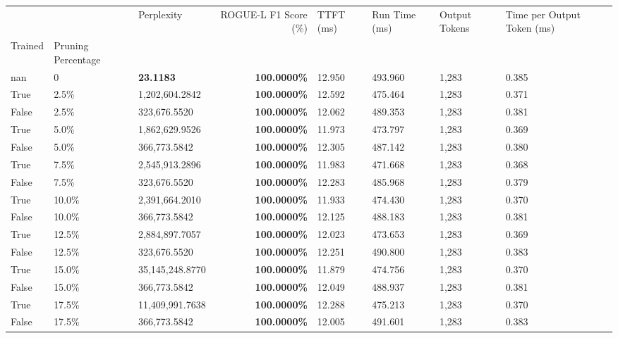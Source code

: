 \begin{table}[H]
\label{tab:evaluation-pipeline-13}
\begin{tabular}{lllrllll}
\toprule
 &  & Perplexity & ROGUE-L F1 Score (\%) & TTFT (ms) & Run Time (ms) & Output Tokens & Time per Output Token (ms) \\
Trained & Pruning Percentage &  &  &  &  &  &  \\
\midrule
nan & 0 & \bfseries 23.1183 & \bfseries 100.0000\% & 12.950 & 493.960 & 1,283 & 0.385 \\
\cline{1-8}
True & 2.5\% & 1,202,604.2842 & \bfseries \color{red} 100.0000\% & 12.592 & 475.464 & 1,283 & 0.371 \\
\cline{1-8}
False & 2.5\% & 323,676.5520 & \bfseries \color{red} 100.0000\% & 12.062 & 489.353 & 1,283 & 0.381 \\
\cline{1-8}
True & 5.0\% & 1,862,629.9526 & \bfseries \color{red} 100.0000\% & 11.973 & 473.797 & 1,283 & 0.369 \\
\cline{1-8}
False & 5.0\% & 366,773.5842 & \bfseries \color{red} 100.0000\% & 12.305 & 487.142 & 1,283 & 0.380 \\
\cline{1-8}
True & 7.5\% & 2,545,913.2896 & \bfseries \color{red} 100.0000\% & 11.983 & 471.668 & 1,283 & 0.368 \\
\cline{1-8}
False & 7.5\% & 323,676.5520 & \bfseries \color{red} 100.0000\% & 12.283 & 485.968 & 1,283 & 0.379 \\
\cline{1-8}
True & 10.0\% & 2,391,664.2010 & \bfseries \color{red} 100.0000\% & 11.933 & 474.430 & 1,283 & 0.370 \\
\cline{1-8}
False & 10.0\% & 366,773.5842 & \bfseries \color{red} 100.0000\% & 12.125 & 488.183 & 1,283 & 0.381 \\
\cline{1-8}
True & 12.5\% & 2,884,897.7057 & \bfseries \color{red} 100.0000\% & 12.023 & 473.653 & 1,283 & 0.369 \\
\cline{1-8}
False & 12.5\% & 323,676.5520 & \bfseries \color{red} 100.0000\% & 12.251 & 490.800 & 1,283 & 0.383 \\
\cline{1-8}
True & 15.0\% & 35,145,248.8770 & \bfseries \color{red} 100.0000\% & 11.879 & 474.756 & 1,283 & 0.370 \\
\cline{1-8}
False & 15.0\% & 366,773.5842 & \bfseries \color{red} 100.0000\% & 12.049 & 488.937 & 1,283 & 0.381 \\
\cline{1-8}
True & 17.5\% & 11,409,991.7638 & \bfseries \color{red} 100.0000\% & 12.288 & 475.213 & 1,283 & 0.370 \\
\cline{1-8}
False & 17.5\% & 366,773.5842 & \bfseries \color{red} 100.0000\% & 12.005 & 491.601 & 1,283 & 0.383 \\

\end{tabular}
\end{table}
